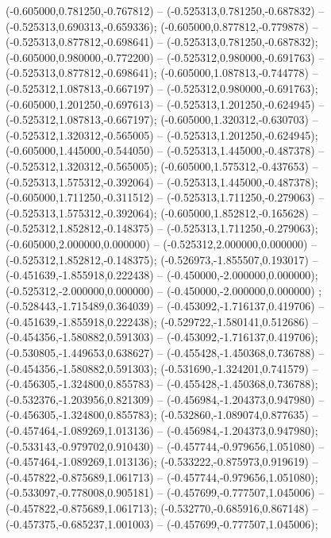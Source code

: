  (-0.605000,0.781250,-0.767812) -- (-0.525313,0.781250,-0.687832) -- (-0.525313,0.690313,-0.659336);
 (-0.605000,0.877812,-0.779878) -- (-0.525313,0.877812,-0.698641) -- (-0.525313,0.781250,-0.687832);
 (-0.605000,0.980000,-0.772200) -- (-0.525312,0.980000,-0.691763) -- (-0.525313,0.877812,-0.698641);
 (-0.605000,1.087813,-0.744778) -- (-0.525312,1.087813,-0.667197) -- (-0.525312,0.980000,-0.691763);
 (-0.605000,1.201250,-0.697613) -- (-0.525313,1.201250,-0.624945) -- (-0.525312,1.087813,-0.667197);
 (-0.605000,1.320312,-0.630703) -- (-0.525312,1.320312,-0.565005) -- (-0.525313,1.201250,-0.624945);
 (-0.605000,1.445000,-0.544050) -- (-0.525313,1.445000,-0.487378) -- (-0.525312,1.320312,-0.565005);
 (-0.605000,1.575312,-0.437653) -- (-0.525313,1.575312,-0.392064) -- (-0.525313,1.445000,-0.487378);
 (-0.605000,1.711250,-0.311512) -- (-0.525313,1.711250,-0.279063) -- (-0.525313,1.575312,-0.392064);
 (-0.605000,1.852812,-0.165628) -- (-0.525312,1.852812,-0.148375) -- (-0.525313,1.711250,-0.279063);
 (-0.605000,2.000000,0.000000) -- (-0.525312,2.000000,0.000000) -- (-0.525312,1.852812,-0.148375);
 (-0.526973,-1.855507,0.193017) -- (-0.451639,-1.855918,0.222438) -- (-0.450000,-2.000000,0.000000);
 (-0.525312,-2.000000,0.000000) -- (-0.450000,-2.000000,0.000000) ;
 (-0.528443,-1.715489,0.364039) -- (-0.453092,-1.716137,0.419706) -- (-0.451639,-1.855918,0.222438);
 (-0.529722,-1.580141,0.512686) -- (-0.454356,-1.580882,0.591303) -- (-0.453092,-1.716137,0.419706);
 (-0.530805,-1.449653,0.638627) -- (-0.455428,-1.450368,0.736788) -- (-0.454356,-1.580882,0.591303);
 (-0.531690,-1.324201,0.741579) -- (-0.456305,-1.324800,0.855783) -- (-0.455428,-1.450368,0.736788);
 (-0.532376,-1.203956,0.821309) -- (-0.456984,-1.204373,0.947980) -- (-0.456305,-1.324800,0.855783);
 (-0.532860,-1.089074,0.877635) -- (-0.457464,-1.089269,1.013136) -- (-0.456984,-1.204373,0.947980);
 (-0.533143,-0.979702,0.910430) -- (-0.457744,-0.979656,1.051080) -- (-0.457464,-1.089269,1.013136);
 (-0.533222,-0.875973,0.919619) -- (-0.457822,-0.875689,1.061713) -- (-0.457744,-0.979656,1.051080);
 (-0.533097,-0.778008,0.905181) -- (-0.457699,-0.777507,1.045006) -- (-0.457822,-0.875689,1.061713);
 (-0.532770,-0.685916,0.867148) -- (-0.457375,-0.685237,1.001003) -- (-0.457699,-0.777507,1.045006);
